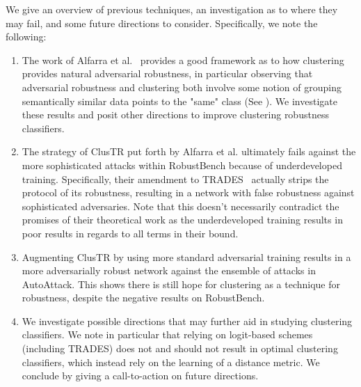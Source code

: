 We give an overview of previous techniques, an investigation as to where they may fail, and some future directions to consider. Specifically, we note the following:
\begin{enumerate}
    \item The work of Alfarra et al.~\cite{Alfarra2020ClusTR} provides a good framework as to how clustering provides natural adversarial robustness, in particular observing that adversarial robustness and clustering both involve some notion of grouping semantically similar data points to the "same" class (See \cite[Figure 1]{Alfarra2020ClusTR}). We investigate these results and posit other directions to improve clustering robustness classifiers.
    \item The strategy of ClusTR put forth by Alfarra et al. ultimately fails against the more sophisticated attacks within RobustBench because of underdeveloped training. Specifically, their amendment to TRADES~\cite{Zhang2019TRADES} actually strips the protocol of its robustness, resulting in a network with false robustness against sophisticated adversaries. Note that this doesn't necessarily contradict the promises of their theoretical work as the underdeveloped training results in poor results in regards to all terms in their bound.
    \item Augmenting ClusTR by using more standard adversarial training results in a more adversarially robust network against the ensemble of attacks in AutoAttack. This shows there is still hope for clustering as a technique for robustness, despite the negative results on RobustBench. 
    \item We investigate possible directions that may further aid in studying clustering classifiers. We note in particular that relying on logit-based schemes (including TRADES) does not and should not result in optimal clustering classifiers, which instead rely on the learning of a distance metric. We conclude by giving a call-to-action on future directions.
\end{enumerate}